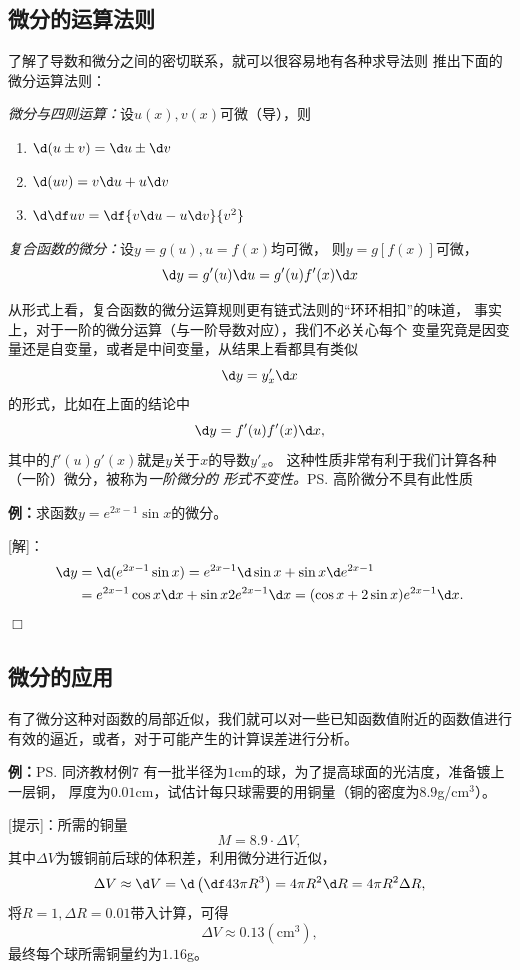 \subsection{微分的运算法则}

了解了导数和微分之间的密切联系，就可以很容易地有各种求导法则
推出下面的微分运算法则：

{\it 微分与四则运算：}设$u(x),v(x)$可微（导），则
\begin{enumerate}[(1)]
  \setlength{\itemindent}{1cm}
  \item $\d (u\pm v)=\d u\pm \d v$
  \item $\d(uv)=v\d u+u\d v$
  \item $\d\df uv=\df{v\d u-u\d v}{v^2}$
\end{enumerate}

{\it 复合函数的微分：}设$y=g(u),u=f(x)$均可微，
则$y=g[f(x)]$可微，
$$\d y=g'(u)\d u=g'(u)f'(x)\d x$$

从形式上看，复合函数的微分运算规则更有链式法则的“环环相扣”的味道，
事实上，对于一阶的微分运算（与一阶导数对应），我们不必关心每个
变量究竟是因变量还是自变量，或者是中间变量，从结果上看都具有类似
$$\d y=y'_x\d x$$
的形式，比如在上面的结论中
$$\d y=f'(u)f'(x)\d x,$$
其中的$f'(u)g'(x)$就是$y$关于$x$的导数$y'_x$。
这种性质非常有利于我们计算各种（一阶）微分，被称为{\it 一阶微分的
形式不变性。}\ps{高阶微分不具有此性质}

{\bf 例：}求函数$y=e^{2x-1}\sin x$的微分。

[解]：
\begin{align*}
	\d y
	&=\d(e^{2x-1}\sin x)
	=e^{2x-1}\d\sin x+\sin x\d e^{2x-1}\\
	&=e^{2x-1}\cos x\d x+\sin x 2e^{2x-1}\d x
	=(\cos x+2\sin x)e^{2x-1}\d x.
\end{align*}
\hfill$\Box$

\subsection{微分的应用}

有了微分这种对函数的局部近似，我们就可以对一些已知函数值附近的函数值进行
有效的逼近，或者，对于可能产生的计算误差进行分析。

{\bf 例：}\ps{同济教材例7}
有一批半径为$1$cm的球，为了提高球面的光洁度，准备镀上一层铜，
厚度为$0.01$cm，试估计每只球需要的用铜量（铜的密度为$8.9$g/cm$^3$）。

[提示]：所需的铜量
$$M=8.9\cdot\Delta V,$$
其中$\Delta V$为镀铜前后球的体积差，利用微分进行近似，
$$\Delta V\approx \d V=\d\left(\df43\pi R^3\right)
=4\pi R^2\d R=4\pi R^2\Delta R,$$
将$R=1,\Delta R=0.01$带入计算，可得
$$\Delta V\approx 0.13(\mbox{cm}^3),$$
最终每个球所需铜量约为$1.16$g。

